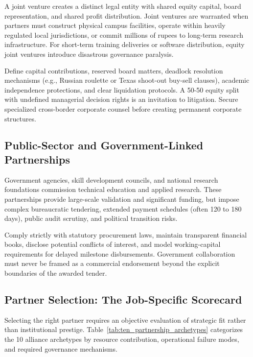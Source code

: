 A joint venture creates a distinct legal entity with shared equity capital, board representation, and shared profit distribution. Joint ventures are warranted when partners must construct physical campus facilities, operate within heavily regulated local jurisdictions, or commit millions of rupees to long-term research infrastructure. For short-term training deliveries or software distribution, equity joint ventures introduce disastrous governance paralysis.

Define capital contributions, reserved board matters, deadlock resolution mechanisms (e.g., Russian roulette or Texas shoot-out buy-sell clauses), academic independence protections, and clear liquidation protocols. A 50-50 equity split with undefined managerial decision rights is an invitation to litigation. Secure specialized cross-border corporate counsel before creating permanent corporate structures.

\subsection{Public-Sector and Government-Linked Partnerships}
\label{sec:public_sector_government_alliances}

Government agencies, skill development councils, and national research foundations commission technical education and applied research. These partnerships provide large-scale validation and significant funding, but impose complex bureaucratic tendering, extended payment schedules (often 120 to 180 days), public audit scrutiny, and political transition risks.

Comply strictly with statutory procurement laws, maintain transparent financial books, disclose potential conflicts of interest, and model working-capital requirements for delayed milestone disbursements. Government collaboration must never be framed as a commercial endorsement beyond the explicit boundaries of the awarded tender.

\subsection{Partner Selection: The Job-Specific Scorecard}
\label{sec:partner_selection_scorecard}

Selecting the right partner requires an objective evaluation of strategic fit rather than institutional prestige. Table~\ref{tab:ten_partnership_archetypes} categorizes the 10 alliance archetypes by resource contribution, operational failure modes, and required governance mechanisms.

